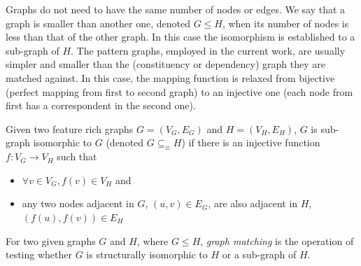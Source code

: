 
Graphs do not need to have the same number of nodes or edges. We say that a graph is smaller than another one, denoted $G \leq H$, when its number of nodes is less than that of the other graph. In this case the isomorphism is established to a sub-graph of $H$. 
The pattern graphs, employed in the current work, are usually simpler and smaller than the (constituency or dependency) graph they are matched against. 
In this case, the mapping function is relaxed from bijective (perfect mapping from first to second graph) to an injective one (each node from first has a correspondent in the second one).

\begin{definition}\label{def:sgisomorphism}
       Given two feature rich graphs $G=(V_G,E_G)$ and $H=(V_H,E_H)$, $G$ is sub-graph isomorphic to $G$ (denoted $G \subseteq_{\equiv} H$) if there is an injective function $f:V_G \rightarrow V_H$ such that
   \begin{itemize}
       \item $\forall v \in V_G, f(v) \in V_H$ and
       \item any two nodes adjacent in $G$, $(u,v) \in E_G$, are also adjacent in $H$, $(f(u), f(v)) \in E_H $
   \end{itemize}
\end{definition}

\begin{definition}\label{def:gmatching}
    For two given graphs $G$ and $H$, where $G \leq H$, \textit{graph matching} is the operation of testing whether $G$ is structurally isomorphic to $H$ or a sub-graph of $H$.
\end{definition}

